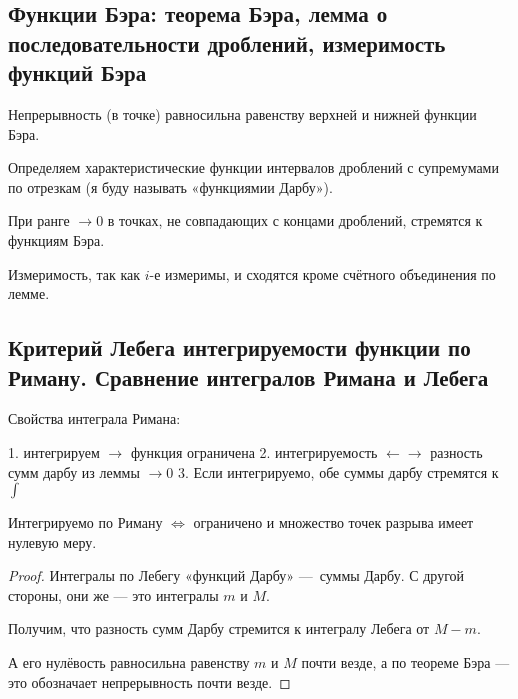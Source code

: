 \documentclass[12pt, a4paper, oneside]{memoir}
\begin{document}
\subsection{Функции Бэра: теорема Бэра, лемма о последовательности дроблений, измеримость функций Бэра}

\begin{theorem}

    Непрерывность (в точке) равносильна равенству верхней и нижней функции Бэра.
\end{theorem}


\begin{lemma}

    Определяем характеристические функции интервалов дроблений с супремумами по отрезкам (я буду называть «функциямии Дарбу»).

    При ранге $→ 0$ в точках, не совпадающих с концами дроблений, стремятся к функциям Бэра.
\end{lemma}

Измеримость, так как $i$-е измеримы, и сходятся кроме счётного объединения по лемме.


\subsection{Критерий Лебега интегрируемости функции по Риману. 
Сравнение интегралов Римана и Лебега}

Свойства интеграла Римана: 

1. интегрируем $→$ функция ограничена
2. интегрируемость $←→$ разность сумм дарбу из леммы $→ 0$
3. Если интегрируемо, обе суммы дарбу стремятся к $\int$

\begin{theorem}

    Интегрируемо по Риману $\Leftrightarrow$ ограничено и множество точек разрыва имеет нулевую меру.

    \begin{proof}
        Интегралы по Лебегу «функций Дарбу» — суммы Дарбу. С другой стороны, они же — это интегралы $m$ и $M$.

        Получим, что разность сумм Дарбу стремится к интегралу Лебега от $M - m$.

        А его нулёвость равносильна равенству $m$ и $M$ почти везде,
        а по теореме Бэра — это обозначает непрерывность почти везде.
    \end{proof}
\end{theorem}
\end{document}
